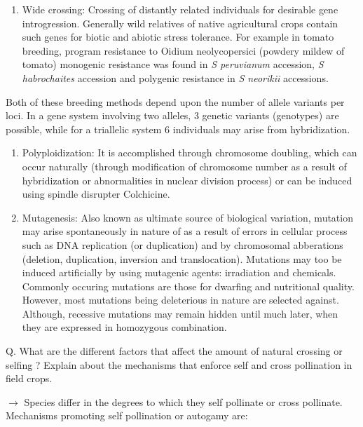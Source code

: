 \documentclass[
  openany]{book}
\providecommand{\tightlist}{%
  \setlength{\itemsep}{0pt}\setlength{\parskip}{0pt}}
\begin{document}
\begin{enumerate}
\def\labelenumi{\arabic{enumi}.}
\setcounter{enumi}{1}
\tightlist
\item
  Wide crossing: Crossing of distantly related individuals for desirable gene introgression. Generally wild relatives of native agricultural crops contain such genes for biotic and abiotic stress tolerance. For example in tomato breeding, program resistance to Oidium neolycopersici (powdery mildew of tomato) monogenic resistance was found in \emph{S peruvianum} accession, \emph{S habrochaites} accession and polygenic resistance in \emph{S neorikii} accessions.
\end{enumerate}

Both of these breeding methods depend upon the number of allele variants per loci. In a gene system involving two alleles, 3 genetic variants (genotypes) are possible, while for a triallelic system 6 individuals may arise from hybridization.

\begin{enumerate}
\def\labelenumi{\arabic{enumi}.}
\setcounter{enumi}{2}
\item
  Polyploidization: It is accomplished through chromosome doubling, which can occur naturally (through modification of chromosome number as a result of hybridization or abnormalities in nuclear division process) or can be induced using spindle disrupter Colchicine.
\item
  Mutagenesis: Also known as ultimate source of biological variation, mutation may arise spontaneously in nature of as a result of errors in cellular process such as DNA replication (or duplication) and by chromosomal abberations (deletion, duplication, inversion and translocation). Mutations may too be induced artificially by using mutagenic agents: irradiation and chemicals. Commonly occuring mutations are those for dwarfing and nutritional quality. However, most mutations being deleterious in nature are selected against. Although, recessive mutations may remain hidden until much later, when they are expressed in homozygous combination.
\end{enumerate}

Q. What are the different factors that affect the amount of natural crossing or selfing ? Explain about the mechanisms that enforce self and cross pollination in field crops.

\(\longrightarrow\) Species differ in the degrees to which they self pollinate or cross pollinate. Mechanisms promoting self pollination or autogamy are:
\end{document}
